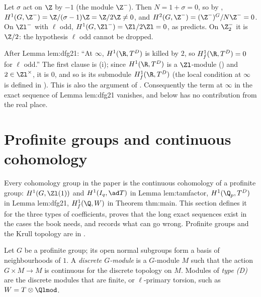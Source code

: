 \begin{example}\label{ex:cohomology:z2-examples}
Let $\sigma$ act on $\Z$ by $-1$ (the module $\Z^-$). Then $N=1+\sigma=0$, so by , $H^1(G,\Z^-)=\Z/(\sigma-1)\Z=\Z/2\Z\ne0$, and
$H^2(G,\Z^-)=(\Z^-)^G/N\Z^-=0$. On $\Zl^-$ with $\ell$ odd, $H^1(G,\Zl^-)=\Zl/2\Zl=0$, as  predicts. On $\Z_2^-$ it is $\Z/2$: the
hypothesis $\ell$ odd cannot be dropped.
\end{example}

\begin{paperlink}\label{pl:cohomology:real-place}
After Lemma lem:dfg21: ``At $\infty$, $H^1(\R,T^D)$ is killed by $2$, so $H^1_f(\R,T^D)=0$ for $\ell$ odd.'' The first clause is
(i); since $H^1(\R,T^D)$ is a $\Zl$-module () and $2\in\Zl^\times$, it is $0$, and so is its submodule
$H^1_f(\R,T^D)$ (the local condition at $\infty$ is defined in ). This is also the argument of . Consequently the term at
$\infty$ in the exact sequence of Lemma lem:dfg21 vanishes, and  below has no contribution from the real place.
\end{paperlink}

\section{Profinite groups and continuous cohomology}\label{sec:cohomology:profinite}

Every cohomology group in the paper is the continuous cohomology of a profinite group: $H^1(G,\Zl(1))$ and $H^1(I_q,\ad T)$ in Lemma lem:tamfactor,
$H^1(\Q_p,T^D)$ in Lemma lem:dfg21, $H^1_f(\Q,W)$ in Theorem thm:main. This section defines it for the three types of coefficients, proves that the long
exact sequences exist in the cases the book needs, and records what can go wrong. Profinite groups and the Krull topology are in .

\begin{definition}\label{def:cohomology:discrete}
Let $G$ be a profinite group; its open normal subgroups form a basis of neighbourhoods of $1$. A \emph{discrete $G$-module} is a $G$-module $M$ such that the
action $G\times M\to M$ is continuous for the discrete topology on $M$. Modules of \emph{type (D)} are the discrete modules that are finite, or $\ell$-primary
torsion, such as $W=T\otimes\Qlmod$.
\end{definition}

